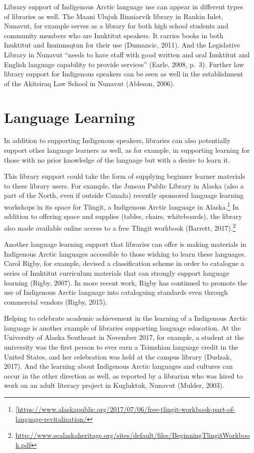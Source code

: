 \documentclass[a4paper,
fontsize=11pt,
oneside,
numbers=noperiodatend,
parskip=half-,
bibliography=totoc,
final
]{scrartcl}
\begin{document}
Library support of Indigenous Arctic language use can appear in
different types of libraries as well. The Maani Ulujuk Ilinniarvik
library in Rankin Inlet, Nunavut, for example serves as a library for
both high school students and community members who are Inuktitut
speakers. It carries books in both Inuktitut and Inuinnaqtun for their
use (Dumancic, 2011). And the Legislative Library in Nunavut
\enquote{needs to have staff with good written and oral Inuktitut and
English language capability to provide services} (Earle, 2008, p.~3).
Further law library support for Indigenous speakers can be seen as well
in the establishment of the Akitsiraq Law School in Nunavut (Ableson,
2006).

\hypertarget{language-learning}{%
\section{Language Learning}\label{language-learning}}

In addition to supporting Indigenous speakers, libraries can also
potentially support other language learners as well, as for example, in
supporting learning for those with no prior knowledge of the language
but with a desire to learn it.

This library support could take the form of supplying beginner learner
materials to these library users. For example, the Juneau Public Library
in Alaska (also a part of the North, even if outside Canada) recently
sponsored language learning workshops in its space for Tlingit, a
Indigenous Arctic language in Alaska.\footnote{{[}\url{https://www.alaskapublic.org/2017/07/06/free-tlingit-workbook-part-of-language-revitalization/}}
In addition to offering space and supplies (tables, chairs,
whiteboards), the library also made available online access to a free
Tlingit workbook (Barrett, 2017).\footnote{\url{http://www.sealaskaheritage.org/sites/default/files/BeginningTlingitWorkbook.pdf}}

Another language learning support that libraries can offer is making
materials in Indigenous Arctic languages accessible to those wishing to
learn these languages. Carol Rigby, for example, devised a
classification scheme in order to catalogue a series of Inuktitut
curriculum materials that can strongly support language learning (Rigby,
2007). In more recent work, Rigby has continued to promote the use of
Indigenous Arctic language into cataloguing standards even through
commercial vendors (Rigby, 2015).

Helping to celebrate academic achievement in the learning of a
Indigenous Arctic language is another example of libraries supporting
language education. At the University of Alaska Southeast in November
2017, for example, a student at the university was the first person to
ever earn a Tsimshian language credit in the United States, and her
celebration was held at the campus library (Dudzak, 2017). And the
learning about Indigenous Arctic languages and cultures can occur in the
other direction as well, as reported by a librarian who was hired to
work on an adult literacy project in Kugluktuk, Nunavut (Mulder, 2003).
\end{document}
